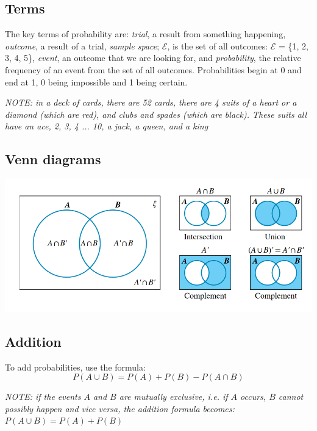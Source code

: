 \documentclass{report}
\begin{document}
\subsection{Terms}
The key terms of probability are: \emph{trial}, a result from something happening, \emph{outcome}, a result of a trial, \emph{sample space}; $\mathcal{E}$, is the set of all outcomes: $\mathcal{E}$ = \{1, 2, 3, 4, 5\}, \emph{event}, an outcome that we are looking for, and \emph{probability}, the relative frequency of an event from the set of all outcomes.  Probabilities begin at 0 and end at 1, 0 being impossible and 1 being certain.

\begin{center}
	\emph{NOTE: in a deck of cards, there are 52 cards, there are 4 suits of a heart or a diamond (which are red), and clubs and spades (which are black).  These suits all have an ace, 2, 3, 4 ... 10, a jack, a queen, and a king}
\end{center}

\subsection{Venn diagrams}
\begin{center}
	\includegraphics[scale=0.5]{venn diagrams}
\end{center}

\subsection{Addition}
To add probabilities, use the formula:
$$
	P(A \cup B) = P(A) + P(B) - P(A \cap B)
$$

\begin{center}
	\emph{NOTE: if the events $A$ and $B$ are mutually exclusive, i.e. if $A$ occurs, $B$ cannot possibly happen and vice versa, the addition formula becomes: $P(A \cup B) = P(A) + P(B)$}
\end{center}
\end{document}
